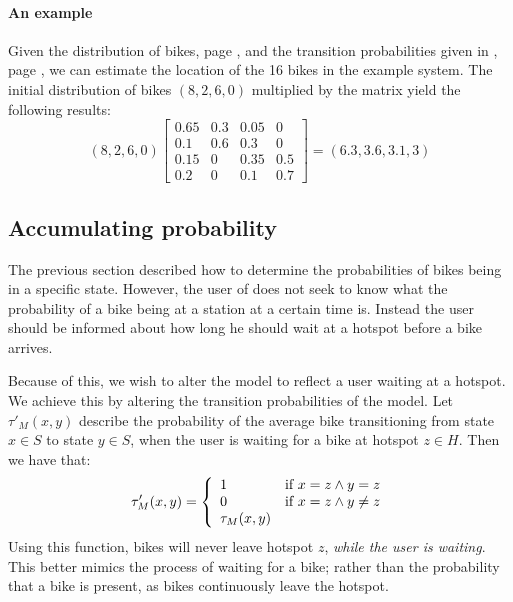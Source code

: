\paragraph{An example}
Given the distribution of bikes, page \pageref{markov:example-vector}, and the transition probabilities given in , page \pageref{markov:model:complex}, we can estimate the location of the 16 bikes in the example system.
The initial distribution of bikes $(8, 2, 6, 0)$ multiplied by the matrix yield the following results:
$$
(8, 2, 6, 0)
\begin{bmatrix}
0.65 & 0.3 & 0.05 & 0\\
0.1  & 0.6 & 0.3  & 0\\
0.15 & 0   & 0.35 & 0.5\\
0.2  & 0   & 0.1  & 0.7
\end{bmatrix}
=
(6.3, 3.6, 3.1, 3)
$$

\subsection{Accumulating probability}
The previous section described how to determine the probabilities of bikes being in a specific state.
However, the user of \projectname{} does not seek to know what the probability of a bike being at a station at a certain time is.
Instead the user should be informed about how long he should wait at a hotspot before a bike arrives.

Because of this, we wish to alter the model to reflect a user waiting at a hotspot.
We achieve this by altering the transition probabilities of the model.
Let $\tau'_M(x,y)$ describe the probability of the average bike transitioning from state $x \in S$ to state $y \in S$, when the user is waiting for a bike at hotspot $z \in H$.
Then we have that:
$$\tau'_M(x, y) = \left\{
  \begin{array}{l l}
    1 & \text{if $x = z \wedge y = z$}\\
    0 & \text{if $x = z \wedge y \neq z$}\\
    \tau_M(x, y) &
  \end{array} \right.$$
Using this function, bikes will never leave hotspot $z$, \textit{while the user is waiting}.
This better mimics the process of waiting for a bike; rather than the probability that a bike is present, as bikes continuously leave the hotspot.
